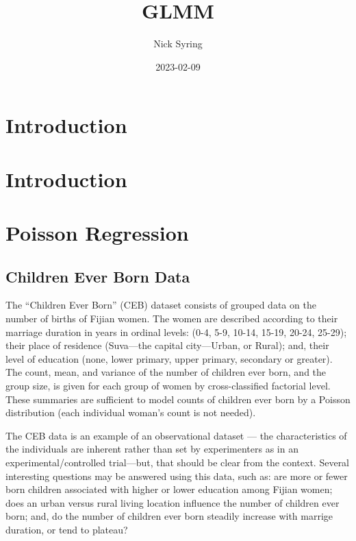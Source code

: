 \documentclass[
]{book}
\title{GLMM}
\author{Nick Syring}
\date{2023-02-09}
\begin{document}
\maketitle

{
\setcounter{tocdepth}{1}
\tableofcontents
}
\hypertarget{introduction}{%
\chapter{Introduction}\label{introduction}}

\hypertarget{intro}{%
\chapter{Introduction}\label{intro}}

\hypertarget{poisson-regression}{%
\chapter{Poisson Regression}\label{poisson-regression}}

\hypertarget{children-ever-born-data}{%
\section{Children Ever Born Data}\label{children-ever-born-data}}

The ``Children Ever Born'' (CEB) dataset consists of grouped data on the number of births of Fijian women. The women are described according to their marriage duration in years in ordinal levels: (0-4, 5-9, 10-14, 15-19, 20-24, 25-29); their place of residence (Suva---the capital city---Urban, or Rural); and, their level of education (none, lower primary, upper primary, secondary or greater). The count, mean, and variance of the number of children ever born, and the group size, is given for each group of women by cross-classified factorial level. These summaries are sufficient to model counts of children ever born by a Poisson distribution (each individual woman's count is not needed).

The CEB data is an example of an observational dataset --- the characteristics of the individuals are inherent rather than set by experimenters as in an experimental/controlled trial---but, that should be clear from the context. Several interesting questions may be answered using this data, such as: are more or fewer born children associated with higher or lower education among Fijian women; does an urban versus rural living location influence the number of children ever born; and, do the number of children ever born steadily increase with marrige duration, or tend to plateau?
\end{document}
